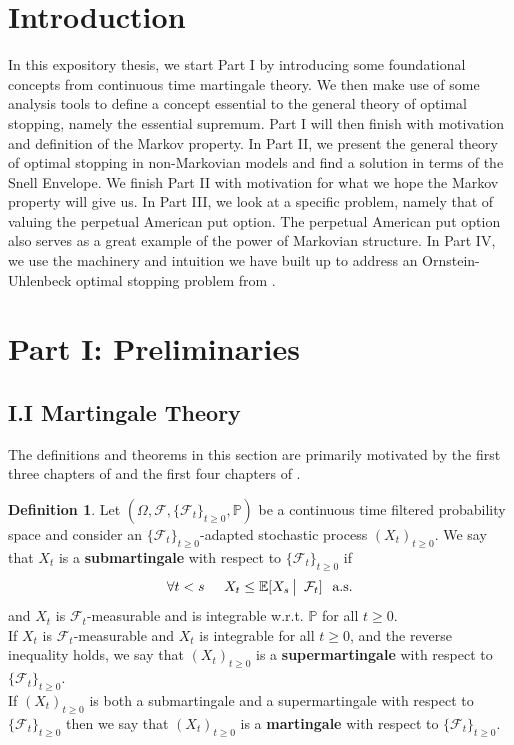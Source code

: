 \documentclass[12pt]{article}
\newcommand{\cF}{\mathcal{F}}
\newcommand{\E}{\mathbb{E}}
\newcommand{\Prb}{\mathbb{P}}
\newcommand{\quantifyspace}{\hspace{2px} \big | \hspace{5px}}
\newcommand{\cFPS}{(\Omega, \cF, \{ \cF_t\}_{t \geq 0}, \Prb)}
\newcommand{\cFi}{\{\cF_t\}_{t \geq 0}}
\newcommand{\spc}{\hspace{7 px}}
\newcommand{\als}{\text{a.s.}}
\theoremstyle{definition}
\newtheorem{defn}{Definition}
\begin{document}
\section*{Introduction}\label{sec:intro}

\qquad
In this expository thesis, we start Part I by introducing some foundational concepts from continuous time martingale theory.
We then make use of some analysis tools to define a concept essential to the general theory of optimal stopping, namely the essential supremum.
Part I will then finish with motivation and definition of the Markov property.
In Part II, we present the general theory of optimal stopping in non-Markovian models and find a solution in terms of the Snell Envelope.
We finish Part II with motivation for what we hope the Markov property will give us.
In Part III, we look at a specific problem, namely that of valuing the perpetual American put option.
The perpetual American put option also serves as a great example of the power of Markovian structure.
In Part IV, we use the machinery and intuition we have built up to address an Ornstein-Uhlenbeck optimal stopping problem from \cite{peskir2006}.



\section*{Part I: Preliminaries}\label{sec:part1}

\subsection*{\quad I.I Martingale Theory}\label{sec:I.I}
The definitions and theorems in this section are primarily motivated by the first three chapters of \cite{karatzas1991} and the first four chapters of \cite{revuz1990}.

\begin{defn} Let $\cFPS$ be a continuous time filtered probability space and consider an $\cFi$-adapted stochastic process $(X_t)_{t \geq 0}$.
We say that $X_t$ is a \textbf{submartingale} with respect to $\cFi$ if \\
\[
    \forall t < s \spc \spc X_t \leq \E[ X_s \quantifyspace \cF_t] \spc  \als
\]
and $X_t$ is $\cF_t$-measurable and is integrable w.r.t. $\Prb$ for all $t \geq 0$. \\
If $X_t $ is $\cF_t$-measurable and $X_t$ is integrable for all $t \geq 0$, and the reverse inequality holds, we say that $(X_t)_{t \geq 0}$ is a \textbf{supermartingale} with respect to $\cFi$. \\
If $(X_t)_{t \geq 0}$ is both a submartingale and a supermartingale with respect to $\cFi$ then we say that $(X_t)_{t \geq 0}$ is a \textbf{martingale} with respect to $\cFi$. \\
\end{defn}
\end{document}
